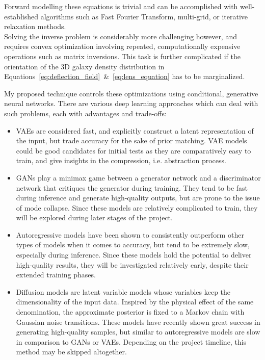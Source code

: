 \documentclass[a4paper,10pt]{article}
\begin{document}
Forward modelling these equations is trivial and can be accomplished
with well-established algorithms such as Fast Fourier Transform,
multi-grid, or iterative relaxation methods. \\[0pt]
Solving the inverse problem is considerably more challenging however,
and requires convex optimization involving repeated, computationally
expensive operations such as matrix inversions. This task is further
complicated if the orientation of the 3D galaxy density distribution
in
Equations~\eqref{eq:deflection_field}~\&~\eqref{eq:lens_equation}
has to be marginalized.

My proposed technique controls these optimizations using conditional,
generative neural networks. There are various deep learning approaches
which can deal with such problems, each with advantages and
trade-offs:
\begin{itemize}[leftmargin=*, noitemsep]
\item VAEs \citep{Kingma13} are considered fast, and explicitly construct a
latent representation of the input, but trade accuracy for the sake
of prior matching. VAE models could be good candidates for initial
tests as they are comparatively easy to train, and give insights in
the compression, i.e. abstraction process.
\item GANs \citep{Goodfellow14} play a minimax game between a generator
network and a discriminator network that critiques the generator
during training. They tend to be fast during inference and generate
high-quality outputs, but are prone to the issue of mode
collapse. Since these models are relatively complicated to train,
they will be explored during later stages of the project.
\item Autoregressive models \citep{Parmar18} have been shown to
consistently outperform other types of models when it comes to
accuracy, but tend to be extremely slow, especially during
inference. Since these models hold the potential to deliver
high-quality results, they will be investigated relatively early,
despite their extended training phases.
\item Diffusion models \citep{Sohl-Dickstein15,Ho20} are latent variable
models whose variables keep the dimensionality of the input
data. Inspired by the physical effect of the same denomination, the
approximate posterior is fixed to a Markov chain with Gaussian noise
transitions. These models have recently shown great success in
generating high-quality samples, but similar to autoregressive
models are slow in comparison to GANs or VAEs. Depending on the
project timeline, this method may be skipped altogether.
\end{itemize}
\end{document}

